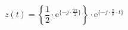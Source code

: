 \[
z(t) =  \left \{ \frac{1}{2} \cdot \textrm{e}^{\{ -j \cdot \frac{3\pi}{2} \}} \right \} \cdot \textrm{e}^{\{ -j \cdot \frac{\pi}{8} \cdot t \}}
\]
